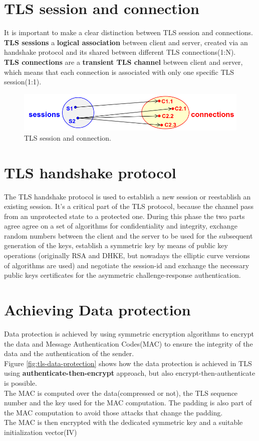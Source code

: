 \section{TLS session and connection}
It is important to make a clear distinction between TLS session and
connections.\\
\textbf{TLS sessions} a \textbf{logical association} between client and server, created
via an handshake protocol and its shared between different TLS
connections(1:N).\\
\textbf{TLS connections} are a \textbf{transient TLS channel} between client and server,
which means that each connection is associated with only one specific
TLS session(1:1).

\begin{figure}[H]
  \centering
  \includegraphics[width=.7\textwidth]{img/TLS session connection.png}
  \caption{TLS session and connection.}
  \label{fig:tls-session-and-connection}
\end{figure}
\section{TLS handshake protocol}
The TLS handshake protocol is used to establish a new session or
reestablish an existing session. It's a critical part of the TLS
protocol, because the channel pass from an unprotected state to a
protected one. During this phase the two parts agree
agree on a set of algorithms for confidentiality and integrity,
exchange random numbers between the client and the server to be used
for the subsequent generation of the keys, establish a symmetric key
by means of public key operations (originally RSA and DHKE, but
nowadays the elliptic curve versions of algorithms are used) and negotiate the
session-id and exchange the necessary public keys certificates for the
asymmetric challenge-response authentication.

\section{Achieving Data protection}
Data protection is achieved by using symmetric encryption algorithms
to encrypt the data and Message Authentication Codes(MAC) to ensure
the integrity of the data and the authentication of the sender.\\
Figure \ref{fig:tls-data-protection} shows how the data protection is 
achieved in TLS using \textbf{authenticate-then-encrypt} approach, but
also encrypt-then-authenticate is possible.\\
The MAC is computed over the data(compressed or not), the TLS sequence 
number and the key used for the MAC computation. The padding is also
part of the MAC computation to avoid those attacks that change the
padding.\\
The MAC is then encrypted with the dedicated symmetric key and a
suitable initialization vector(IV) 

